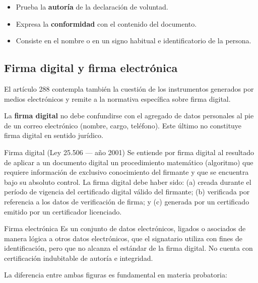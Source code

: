 \documentclass[12pt,oneside]{book}
\begin{document}
\begin{itemize}
    \item Prueba la \textbf{autoría} de la declaración de voluntad.
    \item Expresa la \textbf{conformidad} con el contenido del documento.
    \item Consiste en el nombre o en un signo habitual e identificatorio de la persona.
\end{itemize}

\subsection{Firma digital y firma electrónica}

El artículo 288 contempla también la cuestión de los instrumentos generados por medios electrónicos y remite a la normativa específica sobre firma digital.

\begin{important}
La \textbf{firma digital} no debe confundirse con el agregado de datos personales al pie de un correo electrónico (nombre, cargo, teléfono). Este último no constituye firma digital en sentido jurídico.
\end{important}

\begin{definition}{Firma digital (Ley 25.506 — año 2001)}
Se entiende por firma digital al resultado de aplicar a un documento digital un procedimiento matemático (algoritmo) que requiere información de exclusivo conocimiento del firmante y que se encuentra bajo su absoluto control. La firma digital debe haber sido: (a) creada durante el período de vigencia del certificado digital válido del firmante; (b) verificada por referencia a los datos de verificación de firma; y (c) generada por un certificado emitido por un certificador licenciado.
\end{definition}

\begin{definition}{Firma electrónica}
Es un conjunto de datos electrónicos, ligados o asociados de manera lógica a otros datos electrónicos, que el signatario utiliza con fines de identificación, pero que no alcanza el estándar de la firma digital. No cuenta con certificación indubitable de autoría e integridad.
\end{definition}

La diferencia entre ambas figuras es fundamental en materia probatoria:
\end{document}
